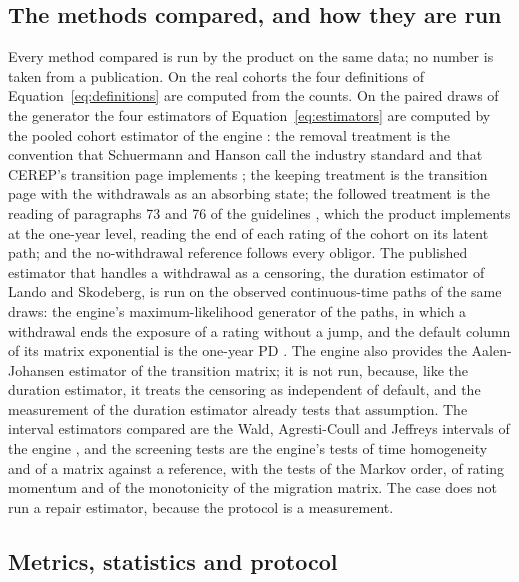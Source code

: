 \subsection{The methods compared, and how they are run}
\label{sec:design-methods}

Every method compared is run by the product on the same data; no number is taken from a publication. On the real cohorts the four definitions of Equation~\eqref{eq:definitions} are computed from the counts. On the paired draws of the generator the four estimators of Equation~\eqref{eq:estimators} are computed by the pooled cohort estimator of the engine \citep{Anderson_1957}: the removal treatment is the convention that Schuermann and Hanson call the industry standard and that CEREP's transition page implements \citep{Schuermann_2004}; the keeping treatment is the transition page with the withdrawals as an absorbing state; the followed treatment is the reading of paragraphs 73 and 76 of the guidelines \citep{EBA_2017}, which the product implements at the one-year level, reading the end of each rating of the cohort on its latent path; and the no-withdrawal reference follows every obligor. The published estimator that handles a withdrawal as a censoring, the duration estimator of Lando and Skodeberg, is run on the observed continuous-time paths of the same draws: the engine's maximum-likelihood generator of the paths, in which a withdrawal ends the exposure of a rating without a jump, and the default column of its matrix exponential is the one-year PD \citep{Lando_2002}. The engine also provides the Aalen-Johansen estimator of the transition matrix; it is not run, because, like the duration estimator, it treats the censoring as independent of default, and the measurement of the duration estimator already tests that assumption. The interval estimators compared are the Wald, Agresti-Coull and Jeffreys intervals of the engine \citep{Brown_2001,Agresti_1998}, and the screening tests are the engine's tests of time homogeneity and of a matrix against a reference, with the tests of the Markov order, of rating momentum and of the monotonicity of the migration matrix. The case does not run a repair estimator, because the protocol is a measurement.

\subsection{Metrics, statistics and protocol}
\label{sec:design-protocol}

